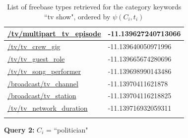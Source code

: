 \documentclass[a4paper, twoside, 12pt]{report}
\begin{document}
\begin{longtable}{| p{} | p{} |}
\url{/tv/multipart_tv_episode} & -11.139627240713066 \\ \hline
\url{/tv/tv_crew_gig} & -11.139640050971996 \\ \hline
\url{/tv/tv_guest_role} & -11.139665674280696 \\ \hline
\url{/tv/tv_song_performer} & -11.139698990143486 \\ \hline
\url{/broadcast/tv_channel} & -11.13970411621878 \\ \hline
\url{/broadcast/tv_station} & -11.139704116218825 \\ \hline
\url{/tv/tv_network_duration} & -11.139716932059311 \\ \hline


\caption{List of freebase types retrieved for the category keywords ``tv show", ordered by $\psi(C_i,t_i)$}
\label{tab:tvshow}
\end{longtable}

\textbf{Query 2:} $C_{i}$ = ``politician"
\end{document}
